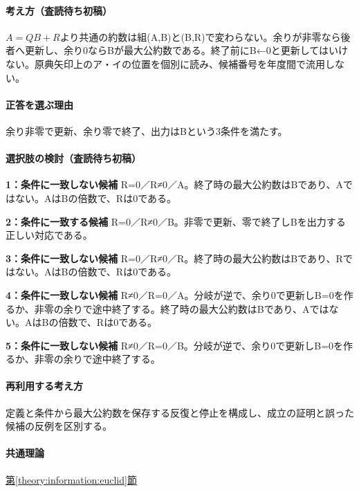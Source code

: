 \paragraph{考え方（査読待ち初稿）} \(A=QB+R\)より共通の約数は組(A,B)と(B,R)で変わらない。余りが非零なら後者へ更新し、余り0ならBが最大公約数である。終了前にB←0と更新してはいけない。原典矢印上のア・イの位置を個別に読み、候補番号を年度間で流用しない。

\paragraph{正答を選ぶ理由} 余り非零で更新、余り零で終了、出力はBという3条件を満たす。

\paragraph{選択肢の検討（査読待ち初稿）}\mbox{}\par

\noindent\textbf{1：条件に一致しない候補} R=\allowbreak{}0／R≠0／A。終了時の最大公約数はBであり、Aではない。AはBの倍数で、Rは0である。\par

\noindent\textbf{2：条件に一致する候補} R=\allowbreak{}0／R≠0／B。非零で更新、零で終了しBを出力する正しい対応である。\par

\noindent\textbf{3：条件に一致しない候補} R=\allowbreak{}0／R≠0／R。終了時の最大公約数はBであり、Rではない。AはBの倍数で、Rは0である。\par

\noindent\textbf{4：条件に一致しない候補} R≠0／R=\allowbreak{}0／A。分岐が逆で、余り0で更新しB=\allowbreak{}0を作るか、非零の余りで途中終了する。終了時の最大公約数はBであり、Aではない。AはBの倍数で、Rは0である。\par

\noindent\textbf{5：条件に一致しない候補} R≠0／R=\allowbreak{}0／B。分岐が逆で、余り0で更新しB=\allowbreak{}0を作るか、非零の余りで途中終了する。\par

\paragraph{再利用する考え方} 定義と条件から最大公約数を保存する反復と停止を構成し、成立の証明と誤った候補の反例を区別する。

\paragraph{共通理論} \hyperref[theory:information:euclid]{第\ref*{theory:information:euclid}節}

